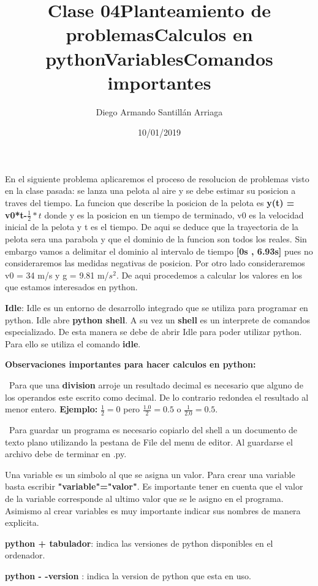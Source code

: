 \documentclass[letter paper, 12pt, oneside]{article}
\title{\Huge Clase 04}
\author{Diego Armando Santillán Arriaga}
\date{10/01/2019}
\begin{document}
	\maketitle
\newpage
\title{\huge\textbf{Planteamiento de problemas}}


En el siguiente problema aplicaremos el proceso de resolucion de problemas visto en la clase pasada: se lanza una pelota al aire y se debe estimar su posicion a traves del tiempo. 
La funcion que describe la posicion de la pelota es \textbf{y(t) = v0*t-$\frac{1}{2}*t$} donde y es la posicion en un tiempo de terminado, v0 es la velocidad inicial de la pelota y t es el tiempo. De aqui se deduce que la trayectoria de la pelota sera una parabola y que el dominio de la funcion son todos los reales. Sin embargo vamos a delimitar el dominio al intervalo de tiempo \textbf{[0s , 6.93s]} pues no consideraremos las medidas negativas de posicion. Por otro lado consideraremos v0 = 34 m/s y g = 9.81 m/$s^{2}$. De aqui procedemos a calcular los valores en los que estamos interesados en python. 


\title{\huge\textbf{Calculos en python}}

\textbf{Idle}: Idle es un entorno de desarrollo integrado que se utiliza para programar en python. Idle abre \textbf{python shell}. A su vez un  \textbf{shell} es un interprete de comandos especializado. De esta manera se debe de abrir Idle para poder utilizar python. Para ello se utiliza el comando \textbf{idle}.

\textbf{Observaciones importantes para hacer calculos en python:}

~Para que una \textbf{division} arroje un resultado decimal es necesario que alguno de los operandos este escrito como decimal. De lo contrario redondea el resultado al menor entero. \textbf{Ejemplo:} $\frac{1}{2} = 0$ pero $\frac{1.0}{2} = 0.5$ o $\frac{1}{2.0} = 0.5$.

~Para guardar un programa es necesario copiarlo del shell a un documento de texto plano utilizando la pestana de File del menu de editor. Al guardarse el archivo debe de terminar en .py.


\title{\huge\textbf{Variables}}

Una variable es un simbolo al que se asigna un valor. Para crear una variable basta escribir \textbf{"variable"="valor"}. Es importante tener en cuenta que el valor de la variable corresponde al ultimo valor que se le asigno en el programa. Asimismo al crear variables es muy importante indicar sus nombres de manera explicita. 

\title{\huge\textbf{Comandos importantes}}


\textbf{python + tabulador}: indica las versiones de python disponibles en el ordenador.

 
\textbf{python - -version} : indica la version de python que esta en uso.
\end{document}
